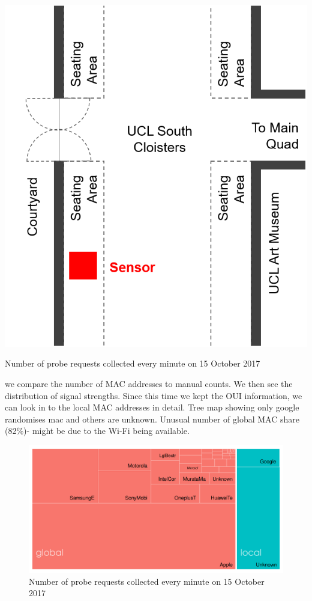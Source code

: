 \begin{marginfigure}
  \forceversofloat
  \includegraphics[trim={5 5 5 5},clip]{images/south-cloisters.png}
  \caption{Number of probe requests collected every minute on 15 October 2017}
  \label{figure:collection:ucl:config}
\end{marginfigure}

we compare the number of MAC addresses to manual counts.
We then see the distribution of signal strengths.
Since this time we kept the OUI information, we can look in to the local MAC addresses in detail.
Tree map showing only google randomises mac and others are unknown.
Unusual number of global MAC share (82\%)- might be due to the Wi-Fi being available.

\lipsum[1]
\begin{figure}
  \includegraphics{images/ucl-local-treemap.png}
  \caption{Number of probe requests collected every minute on 15 October 2017}
  \label{figure:collection:ucl:config}
\end{figure}


